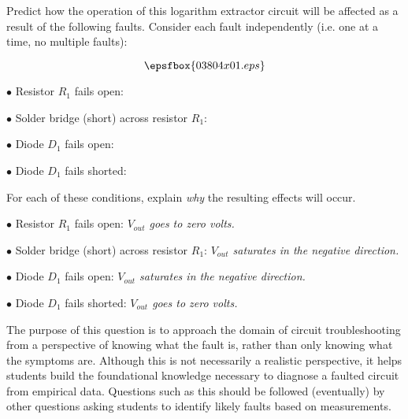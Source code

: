

Predict how the operation of this logarithm extractor circuit will be affected as a result of the following faults.  Consider each fault independently (i.e. one at a time, no multiple faults):

$$\epsfbox{03804x01.eps}$$

\medskip
\item{$\bullet$} Resistor $R_1$ fails open:
\vskip 5pt
\item{$\bullet$} Solder bridge (short) across resistor $R_1$:
\vskip 5pt
\item{$\bullet$} Diode $D_1$ fails open:
\vskip 5pt
\item{$\bullet$} Diode $D_1$ fails shorted:
\medskip

For each of these conditions, explain {\it why} the resulting effects will occur.







\medskip
\item{$\bullet$} Resistor $R_1$ fails open: {\it $V_{out}$ goes to zero volts.}
\vskip 5pt
\item{$\bullet$} Solder bridge (short) across resistor $R_1$: {\it $V_{out}$ saturates in the negative direction.}
\vskip 5pt
\item{$\bullet$} Diode $D_1$ fails open: {\it $V_{out}$ saturates in the negative direction.}
\vskip 5pt
\item{$\bullet$} Diode $D_1$ fails shorted: {\it $V_{out}$ goes to zero volts.}
\medskip







The purpose of this question is to approach the domain of circuit troubleshooting from a perspective of knowing what the fault is, rather than only knowing what the symptoms are.  Although this is not necessarily a realistic perspective, it helps students build the foundational knowledge necessary to diagnose a faulted circuit from empirical data.  Questions such as this should be followed (eventually) by other questions asking students to identify likely faults based on measurements.





